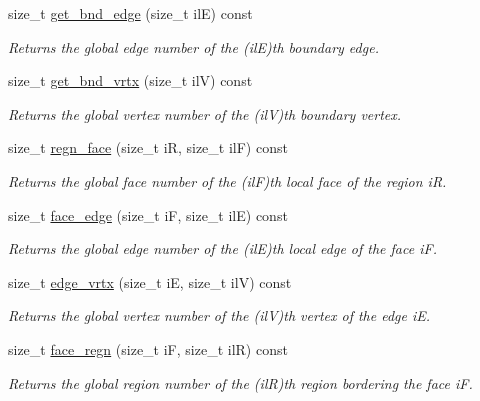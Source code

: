 \begin{DoxyCompactItemize}
size\+\_\+t \hyperlink{classStemMesh3D_1_1mesh__3Dv_a329a4b4f0ae621e3a700c61d52f82fdd}{get\+\_\+bnd\+\_\+edge} (size\+\_\+t ilE) const
\begin{DoxyCompactList}\small\item\em Returns the global edge number of the (ilE)\textquotesingle{}th boundary edge. \end{DoxyCompactList}\item 
size\+\_\+t \hyperlink{classStemMesh3D_1_1mesh__3Dv_a397ec757e2e38525d7a9721112f6a08a}{get\+\_\+bnd\+\_\+vrtx} (size\+\_\+t ilV) const
\begin{DoxyCompactList}\small\item\em Returns the global vertex number of the (ilV)\textquotesingle{}th boundary vertex. \end{DoxyCompactList}\item 
size\+\_\+t \hyperlink{classStemMesh3D_1_1mesh__3Dv_a761e6d7a78b1547681310935e1ce0a8c}{regn\+\_\+face} (size\+\_\+t iR, size\+\_\+t ilF) const
\begin{DoxyCompactList}\small\item\em Returns the global face number of the (ilF)\textquotesingle{}th local face of the region iR. \end{DoxyCompactList}\item 
size\+\_\+t \hyperlink{classStemMesh3D_1_1mesh__3Dv_a70f328491a6660c05914c9226e297ecc}{face\+\_\+edge} (size\+\_\+t iF, size\+\_\+t ilE) const
\begin{DoxyCompactList}\small\item\em Returns the global edge number of the (ilE)\textquotesingle{}th local edge of the face iF. \end{DoxyCompactList}\item 
size\+\_\+t \hyperlink{classStemMesh3D_1_1mesh__3Dv_a7024d4e9bd97ff05c7926c9b4a97be62}{edge\+\_\+vrtx} (size\+\_\+t iE, size\+\_\+t ilV) const
\begin{DoxyCompactList}\small\item\em Returns the global vertex number of the (ilV)\textquotesingle{}th vertex of the edge iE. \end{DoxyCompactList}\item 
size\+\_\+t \hyperlink{classStemMesh3D_1_1mesh__3Dv_afd4c48e4133adad4c31e6fe8bfb96c2a}{face\+\_\+regn} (size\+\_\+t iF, size\+\_\+t ilR) const
\begin{DoxyCompactList}\small\item\em Returns the global region number of the (ilR)\textquotesingle{}th region bordering the face iF. \end{DoxyCompactList}\item 

\end{DoxyCompactItemize}
